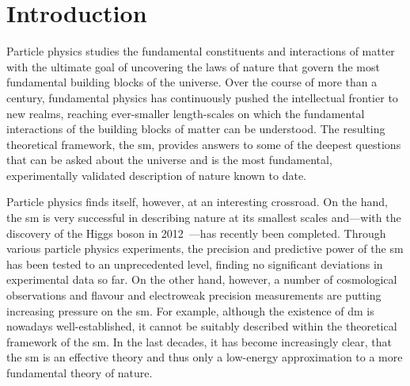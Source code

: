 
\chapter*{Introduction}
\ifpdf
    \graphicspath{{Chapter1/Figs/Raster/}{Chapter1/Figs/PDF/}{Chapter1/Figs/}}
\else
    \graphicspath{{Chapter1/Figs/Vector/}{Chapter1/Figs/}}
\fi

Particle physics studies the fundamental constituents and interactions of matter with the ultimate goal of uncovering the laws of nature that govern the most fundamental building blocks of the universe. Over the course of more than a century, fundamental physics has continuously pushed the intellectual frontier to new realms, reaching ever-smaller length-scales on which the fundamental interactions of the building blocks of matter can be understood. The resulting theoretical framework, the \gls{sm}, provides answers to some of the deepest questions that can be asked about the universe and is the most fundamental, experimentally validated description of nature known to date. 

Particle physics finds itself, however, at an interesting crossroad. On the hand, the \gls{sm} is very successful in describing nature at its smallest scales and---with the discovery of the Higgs boson in 2012~\cite{HIGG-2012-27,CMS-HIG-12-028}---has recently been completed. Through various particle physics experiments, the precision and predictive power of the \gls{sm} has been tested to an unprecedented level, finding no significant deviations in experimental data so far. On the other hand, however, a number of cosmological observations and flavour and electroweak precision measurements are putting increasing pressure on the \gls{sm}. For example, although the existence of \gls{dm} is nowadays well-established, it cannot be suitably described within the theoretical framework of the \gls{sm}. In the last decades, it has become increasingly clear, that the \gls{sm} is an effective theory and thus only a low-energy approximation to a more fundamental theory of nature.

